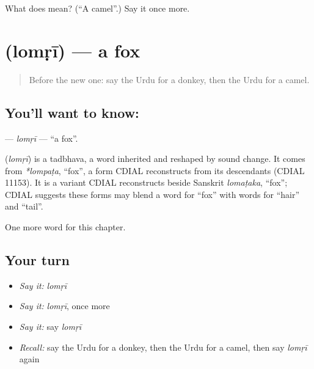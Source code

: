 \begin{tcolorbox}[breakable,colback=teal!4,colframe=teal!35!black,title={Before you move on}]
What does  mean? (\textquotedblleft{}A camel\textquotedblright{}.) Say it once more.
\end{tcolorbox}
\section[\texorpdfstring{\ur{لومڑی} (lomṛī)}{لومڑی (lomṛī)}]{ (lomṛī) — a fox}

\label{lesson:UR-C127-lomri}



\begin{quote}
Before the new one: say the Urdu for a donkey, then the Urdu for a camel.
\end{quote}

\subsection*{You'll want to know: }
\textbf{} — \emph{lomṛī} — \textquotedblleft{}a fox\textquotedblright{}.

\begin{cousinweb}
\textbf{} (\emph{lomṛī}) is a tadbhava, a word inherited and reshaped by sound change. It comes from \emph{*lompaṭa}, \textquotedblleft{}fox\textquotedblright{}, a form CDIAL reconstructs from its descendants (CDIAL 11153). It is a variant CDIAL reconstructs beside Sanskrit \emph{lomaṭaka}, \textquotedblleft{}fox\textquotedblright{}; CDIAL suggests these forms may blend a word for \textquotedblleft{}fox\textquotedblright{} with words for \textquotedblleft{}hair\textquotedblright{} and \textquotedblleft{}tail\textquotedblright{}.
\end{cousinweb}

\begin{grammarlens}[title={What you've built}]
One more word for this chapter.
\end{grammarlens}

\subsection*{Your turn}
\begin{itemize}
\raggedright
  \item \emph{Say it:} \emph{lomṛī}
  \item \emph{Say it:} \emph{lomṛī}, once more
  \item \emph{Say it:} say \emph{lomṛī}
  \item \emph{Recall:} say the Urdu for a donkey, then the Urdu for a camel, then say \emph{lomṛī} again
\end{itemize}

